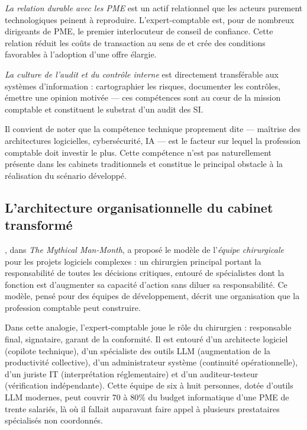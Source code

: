 \documentclass[12pt,a4paper]{article}
\begin{document}
\textit{La relation durable avec les PME} est un actif relationnel que les acteurs purement technologiques peinent à reproduire. L'expert-comptable est, pour de nombreux dirigeants de PME, le premier interlocuteur de conseil de confiance. Cette relation réduit les coûts de transaction au sens de \textcite{williamson1985} et crée des conditions favorables à l'adoption d'une offre élargie.

\textit{La culture de l'audit et du contrôle interne} est directement transférable aux systèmes d'information : cartographier les risques, documenter les contrôles, émettre une opinion motivée — ces compétences sont au cœur de la mission comptable et constituent le substrat d'un audit des SI.

Il convient de noter que la compétence technique proprement dite — maîtrise des architectures logicielles, cybersécurité, IA — est le facteur sur lequel la profession comptable doit investir le plus. Cette compétence n'est pas naturellement présente dans les cabinets traditionnels et constitue le principal obstacle à la réalisation du scénario développé.

\subsection{L'architecture organisationnelle du cabinet transformé}

\textcite{brooks1975}, dans \emph{The Mythical Man-Month}, a proposé le modèle de l'\emph{équipe chirurgicale} pour les projets logiciels complexes : un chirurgien principal portant la responsabilité de toutes les décisions critiques, entouré de spécialistes dont la fonction est d'augmenter sa capacité d'action sans diluer sa responsabilité. Ce modèle, pensé pour des équipes de développement, décrit une organisation que la profession comptable peut construire.

Dans cette analogie, l'expert-comptable joue le rôle du chirurgien : responsable final, signataire, garant de la conformité. Il est entouré d'un architecte logiciel (copilote technique), d'un spécialiste des outils LLM (augmentation de la productivité collective), d'un administrateur système (continuité opérationnelle), d'un juriste IT (interprétation réglementaire) et d'un auditeur-testeur (vérification indépendante). Cette équipe de six à huit personnes, dotée d'outils LLM modernes, peut couvrir 70 à 80\% du budget informatique d'une PME de trente salariés, là où il fallait auparavant faire appel à plusieurs prestataires spécialisés non coordonnés.
\end{document}
